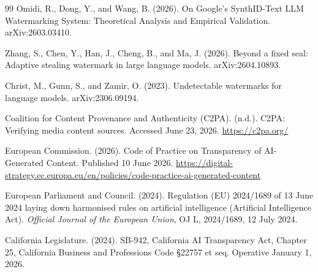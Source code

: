 \documentclass[11pt]{article}
\begin{document}
\begin{thebibliography}{99}
 Omidi, R., Dong, Y., and Wang, B. (2026). On Google's SynthID-Text
LLM Watermarking System: Theoretical Analysis and Empirical Validation.
arXiv:2603.03410.

 Zhang, S., Chen, Y., Han, J., Cheng, B., and Ma, J. (2026). Beyond
a fixed seal: Adaptive stealing watermark in large language models. arXiv:2604.10893.

 Christ, M., Gunn, S., and Zamir, O. (2023). Undetectable watermarks
for language models. arXiv:2306.09194.

 Coalition for Content Provenance and Authenticity (C2PA). (n.d.).
C2PA: Verifying media content sources. Accessed June 23, 2026.
\url{https://c2pa.org/}

 European Commission. (2026). Code of Practice on Transparency of
AI-Generated Content. Published 10 June 2026.
\url{https://digital-strategy.ec.europa.eu/en/policies/code-practice-ai-generated-content}

 European Parliament and Council. (2024). Regulation (EU)
2024/1689 of 13 June 2024 laying down harmonised rules on artificial intelligence
(Artificial Intelligence Act). \emph{Official Journal of the European Union}, OJ L,
2024/1689, 12 July 2024.

 California Legislature. (2024). SB-942, California AI Transparency
Act, Chapter 25, California Business and Professions Code \S22757 et seq. Operative
January 1, 2026.

\end{thebibliography}
\end{document}

